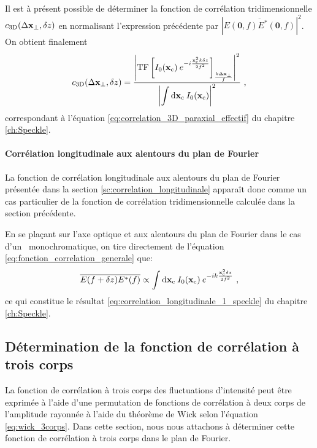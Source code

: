 Il est à présent possible de déterminer la fonction de corrélation tridimensionnelle $c_{\mathrm{3D}}(\Delta\mathbf{x}_{\perp}, \delta z)$ en normalisant l'expression précédente par $|\overline{E(\mathbf{0},f)E^*(\mathbf{0},f)}|^2$. On obtient finalement
\begin{equation}
c_{\mathrm{3D}}(\Delta \mathbf{x}_{\perp} , \delta z) = \frac{{\left| \mathrm{TF} \left[ I_0(\mathbf{x}_{\mathrm{c}})\: e^{-i\frac{\mathbf{x}_{\mathrm{c}}^2 k \delta z}{2f^2}} \right]_{\frac{k\Delta\mathbf{x}_{\perp}}{f}}\right|}^2}{{\left|\displaystyle\int{\mathop{}\mathopen{}\mathrm{d}\mathbf{x}_{\mathrm{c}}\: I_0(\mathbf{x}_{\mathrm{c}})}\right|}^2} \text{ ,}
\end{equation}
correspondant à l'équation \ref{eq:correlation_3D_paraxial_effectif} du chapitre \ref{ch:Speckle}.

\paragraph*{Corrélation longitudinale aux alentours du plan de Fourier}
La fonction de corrélation longitudinale aux alentours du plan de Fourier présentée dans la section \ref{sc:correlation_longitudinale} apparaît donc comme un cas particulier de la fonction de corrélation tridimensionnelle calculée dans la section précédente. 

En se plaçant sur l'axe optique et aux alentours du plan de Fourier dans le cas d'un \speckle\ monochromatique, on tire directement de l'équation \ref{eq:fonction_correlation_generale} que:
\begin{equation}
\overline{E(f+\delta z)E^*(f)} \propto \int{\mathop{}\mathopen{}\mathrm{d}\mathbf{x}_{\mathrm{c}}\: I_0(\mathbf{x}_{\mathrm{c}}) \: e^{-ik \frac{\mathbf{x}_{\mathrm{c}}^2 \delta z}{2f^2}}} \text{ ,}
\end{equation}
ce qui constitue le résultat \ref{eq:correlation_longitudinale_1_speckle} du chapitre \ref{ch:Speckle}.

\subsection{Détermination de la fonction de corrélation à trois corps}
La fonction de corrélation à trois corps des fluctuations d'intensité peut être exprimée à l'aide d'une permutation de fonctions de corrélation à deux corps de l'amplitude rayonnée à l'aide du théorème de Wick selon l'équation \ref{eq:wick_3corps}. Dans cette section, nous nous attachons à déterminer cette fonction de corrélation à trois corps dans le plan de Fourier.

